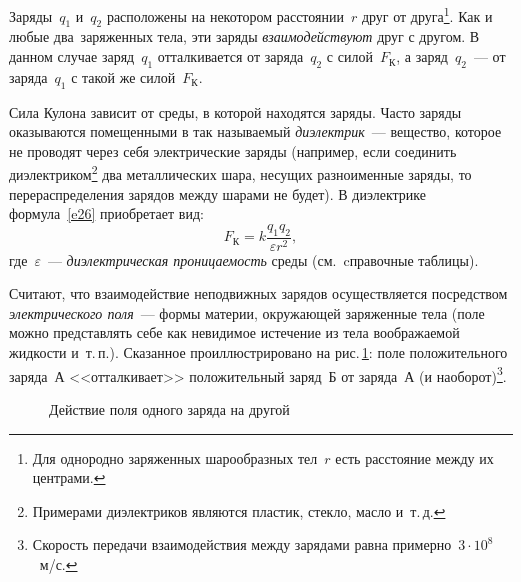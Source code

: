 \documentclass[main.tex]{subfiles}
\begin{document}
Заряды~$q_1$ и~$q_2$ расположены на некотором расстоянии~$r$ друг от друга\footnote{Для однородно заряженных шарообразных тел~$r$ есть расстояние между их центрами.}. Как и любые два~заряженных тела, эти заряды \emph{взаимодействуют} друг с другом. В данном случае заряд~$q_1$ отталкивается от заряда~$q_2$ с силой~$F_\text{К}$, а заряд~$q_2$~--- от заряда~$q_1$ с такой же силой~$F_\text{К}$. 

Сила Кулона зависит от среды, в которой находятся заряды. Часто заряды оказываются помещенными в так называемый \emph{диэлектрик}~--- вещество, которое не проводят через себя электрические заряды (например, если соединить диэлектриком\footnote{Примерами диэлектриков являются пластик, стекло, масло и~т.\,д.} два металлических шара, несущих разноименные заряды, то перераспределения зарядов между шарами не будет). В диэлектрике формула~\eqref{e26} приобретает вид:
\begin{equation*}
    F_\text{К}=k\dfrac{q_1q_2}{\varepsilon r^2},
\end{equation*}
где~$\varepsilon$~--- \emph{диэлектрическая проницаемость} среды (см.~cправочные таблицы). 

Считают, что взаимодействие неподвижных зарядов осуществляется посредством \emph{электрического поля}~--- формы материи, окружающей заряженные тела (поле можно представлять себе как невидимое истечение из тела воображаемой жидкости и~т.\,п.). Сказанное проиллюстрировано на рис.\,\ref{fig:p97}: поле положительного заряда~А <<отталкивает>> положительный заряд~Б от заряда~А (и наоборот)\footnote{Скорость передачи взаимодействия между зарядами равна примерно~$3\cdot10^8$~м/с.}. 


\tikzfading[name=fade out,
inner color=transparent!0,
outer color=transparent!100]

    \begin{figure}[H]
    \centering

\caption{Действие поля одного заряда на другой}
\label{fig:p97}
\end{figure}


















 
\end{document}

